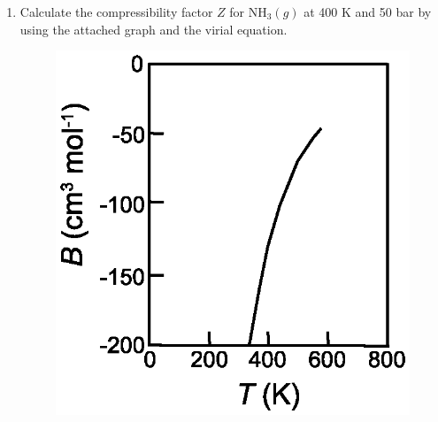 \begin{enumerate}
\item Calculate the compressibility factor $Z$ for NH$_3(g)$ at 400 K and 50 bar by using the attached graph and the virial equation.

\begin{figure}[htp!]
\centering
\includegraphics[scale=1.5]{graph}
\end{figure}


\end{enumerate}
